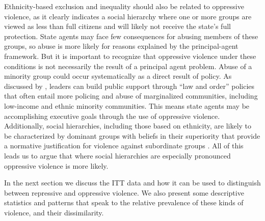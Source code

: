 \documentclass[11pt]{article}
\begin{document}
Ethnicity-based exclusion and inequality should also be related to oppressive violence, as it clearly indicates a social hierarchy where one or more groups are viewed as less than full citizens and will likely not receive the state's full protection. State agents may face few consequences for abusing members of these groups, so abuse is more likely for reasons explained by the principal-agent framework. But it is important to recognize that oppressive violence under these conditions is not necessarily the result of a principal agent problem. Abuse of a minority group could occur systematically as a direct result of policy. As discussed by \citet{Rejali2007}, leaders can build public support through ``law and order'' policies that often entail more policing and abuse of marginalized  communities, including low-income and ethnic minority communities. This means state agents may be accomplishing executive goals through the use of oppressive violence. Additionally, social hierarchies, including those based on ethnicity, are likely to be characterized by dominant groups with beliefs in their superiority that provide a normative justification for violence against subordinate groups \citep{sidanius2001social}. All of this leads us to argue that where social hierarchies are especially pronounced oppressive violence is more likely. 

In the next section we discuss the ITT data and how it can be used to distinguish between repressive and oppressive violence. We also present some descriptive statistics and patterns that speak to the relative prevalence of these kinds of violence, and their dissimilarity. 

\end{document}
